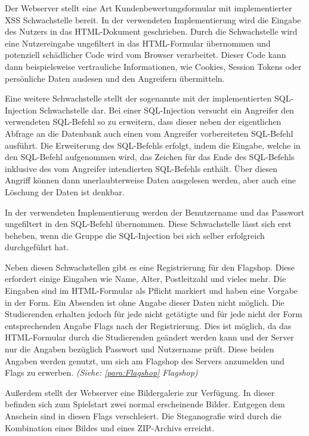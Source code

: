 Der Webserver stellt eine Art Kundenbewertungsformular mit implementierter XSS Schwachstelle bereit. In der verwendeten Implementierung wird die Eingabe des Nutzers in das HTML-Dokument geschrieben. Durch die Schwachstelle wird eine Nutzereingabe ungefiltert in das HTML-Formular übernommen und potenziell schädlicher Code wird vom Browser verarbeitet. Dieser Code kann dann beispielsweise vertrauliche Informationen, wie Cookies, Session Tokens oder persönliche Daten auslesen und den Angreifern übermitteln. \cite{ruettenSicherheitWebanwendungen2007}

Eine weitere Schwachstelle stellt der sogenannte  mit der implementierten SQL-Injection Schwachstelle dar. 
Bei einer SQL-Injection versucht ein Angreifer den verwendeten SQL-Befehl so zu erweitern, dass dieser neben der eigentlichen Abfrage an die Datenbank auch einen vom Angreifer vorbereiteten SQL-Befehl ausführt. Die Erweiterung des SQL-Befehls erfolgt, indem die Eingabe, welche in den SQL-Befehl aufgenommen wird, das Zeichen für das Ende des SQL-Befehls inklusive des vom Angreifer intendierten SQL-Befehls enthält. Über diesen Angriff können dann unerlaubterweise Daten ausgelesen werden, aber auch eine Löschung der Daten ist denkbar. \cite{bachfeldGiftspritze2004}

In der verwendeten Implementierung werden der Benutzername und das Passwort ungefiltert in den SQL-Befehl übernommen. Diese Schwachstelle lässt sich erst beheben, wenn die Gruppe die SQL-Injection bei sich selber erfolgreich durchgeführt hat.

Neben diesen Schwachstellen gibt es eine Registrierung für den Flagshop. Diese erfordert einige Eingaben wie Name, Alter, Postleitzahl und vieles mehr. Die Eingaben sind im HTML-Formular als Pflicht markiert und haben eine Vorgabe in der Form. Ein Absenden ist ohne Angabe dieser Daten nicht möglich. Die Studierenden erhalten jedoch für jede nicht getätigte und für jede nicht der Form entsprechenden Angabe Flags nach der Registrierung. Dies ist möglich, da das HTML-Formular durch die Studierenden geändert werden kann und der Server nur die Angaben bezüglich Passwort und Nutzername prüft. Diese beiden Angaben werden genutzt, um sich am Flagshop des Servers anzumelden und Flags zu erwerben. \textit{(Siehe: \autoref{para:Flagshop} Flagshop)}

Außerdem stellt der Webserver eine Bildergalerie zur Verfügung. In dieser befinden sich zum Spielstart zwei normal erscheinende Bilder. Entgegen dem Anschein sind in diesen Flags verschleiert. Die Steganografie wird durch die Kombination eines Bildes und eines ZIP-Archivs erreicht. \cite{abtsUeberarbeitungUndErweiterung2016}